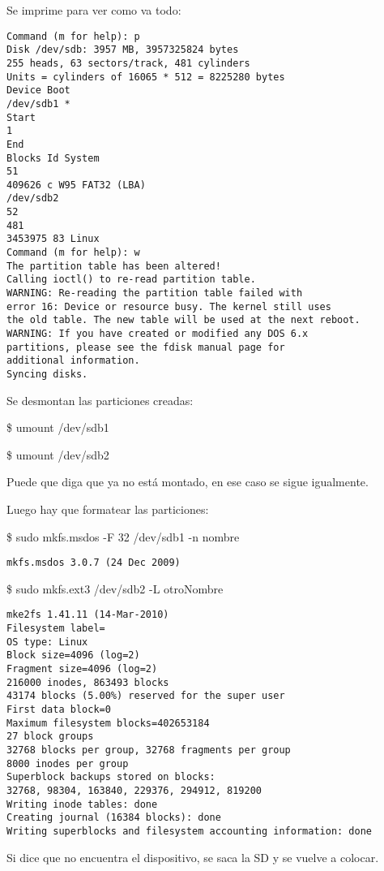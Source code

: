Se imprime para ver como va todo: 

\begin{verbatim}
Command (m for help): p 
Disk /dev/sdb: 3957 MB, 3957325824 bytes 
255 heads, 63 sectors/track, 481 cylinders 
Units = cylinders of 16065 * 512 = 8225280 bytes 
Device Boot 
/dev/sdb1 * 
Start 
1 
End 
Blocks Id System 
51 
409626 c W95 FAT32 (LBA) 
/dev/sdb2 
52 
481 
3453975 83 Linux 
Command (m for help): w 
The partition table has been altered! 
Calling ioctl() to re-read partition table. 
WARNING: Re-reading the partition table failed with 
error 16: Device or resource busy. The kernel still uses 
the old table. The new table will be used at the next reboot. 
WARNING: If you have created or modified any DOS 6.x 
partitions, please see the fdisk manual page for 
additional information. 
Syncing disks. 
\end{verbatim}

\newpage
Se desmontan las particiones creadas: 

\bigskip
\centerline{\$ umount /dev/sdb1}

\centerline{\$ umount /dev/sdb2}

\bigskip
Puede que diga que ya no está montado, en ese caso se sigue igualmente. 

\bigskip
Luego hay que formatear las particiones: 

\bigskip
\centerline{\$ sudo mkfs.msdos -F 32 /dev/sdb1 -n nombre}

\begin{verbatim}
mkfs.msdos 3.0.7 (24 Dec 2009) 
\end{verbatim}

\centerline{\$ sudo mkfs.ext3 /dev/sdb2 -L otroNombre}
\begin{verbatim}
mke2fs 1.41.11 (14-Mar-2010) 
Filesystem label= 
OS type: Linux 
Block size=4096 (log=2) 
Fragment size=4096 (log=2) 
216000 inodes, 863493 blocks 
43174 blocks (5.00%) reserved for the super user 
First data block=0 
Maximum filesystem blocks=402653184 
27 block groups 
32768 blocks per group, 32768 fragments per group 
8000 inodes per group 
Superblock backups stored on blocks: 
32768, 98304, 163840, 229376, 294912, 819200 
Writing inode tables: done 
Creating journal (16384 blocks): done 
Writing superblocks and filesystem accounting information: done
\end{verbatim}

\bigskip
Si dice que no encuentra el dispositivo, se saca la SD y se vuelve a colocar.

\newpage
